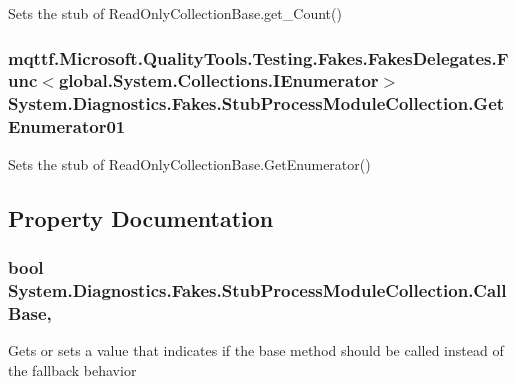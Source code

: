 Sets the stub of Read\-Only\-Collection\-Base.\-get\-\_\-\-Count()

\hypertarget{class_system_1_1_diagnostics_1_1_fakes_1_1_stub_process_module_collection_a7cb03a3f8c06f6d68ff5575cf30f20c5}{
\subsubsection[{Get\-Enumerator01}]{\setlength{\rightskip}{0pt plus 5cm}mqttf.\-Microsoft.\-Quality\-Tools.\-Testing.\-Fakes.\-Fakes\-Delegates.\-Func$<$global.\-System.\-Collections.\-I\-Enumerator$>$ System.\-Diagnostics.\-Fakes.\-Stub\-Process\-Module\-Collection.\-Get\-Enumerator01}}\label{class_system_1_1_diagnostics_1_1_fakes_1_1_stub_process_module_collection_a7cb03a3f8c06f6d68ff5575cf30f20c5}


Sets the stub of Read\-Only\-Collection\-Base.\-Get\-Enumerator()



\subsection{Property Documentation}
\hypertarget{class_system_1_1_diagnostics_1_1_fakes_1_1_stub_process_module_collection_afe6d20e7241b3733318fc537825d1b4e}{
\subsubsection[{Call\-Base}]{\setlength{\rightskip}{0pt plus 5cm}bool System.\-Diagnostics.\-Fakes.\-Stub\-Process\-Module\-Collection.\-Call\-Base\hspace{0.3cm}{\ttfamily [get]}, {\ttfamily [set]}}}\label{class_system_1_1_diagnostics_1_1_fakes_1_1_stub_process_module_collection_afe6d20e7241b3733318fc537825d1b4e}


Gets or sets a value that indicates if the base method should be called instead of the fallback behavior

